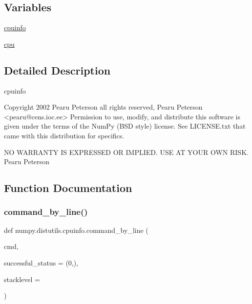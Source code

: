 \subsection*{Variables}
\begin{DoxyCompactItemize}
\item 
\hyperlink{namespacenumpy_1_1distutils_1_1cpuinfo_a7060d89d9372a4fc5fea1cf19eb6fce4}{cpuinfo}
\item 
\hyperlink{namespacenumpy_1_1distutils_1_1cpuinfo_a91351a94ec2341725d2f392f6b5bc469}{cpu}
\end{DoxyCompactItemize}


\subsection{Detailed Description}
\begin{DoxyVerb}cpuinfo

Copyright 2002 Pearu Peterson all rights reserved,
Pearu Peterson <pearu@cens.ioc.ee>
Permission to use, modify, and distribute this software is given under the
terms of the NumPy (BSD style) license.  See LICENSE.txt that came with
this distribution for specifics.

NO WARRANTY IS EXPRESSED OR IMPLIED.  USE AT YOUR OWN RISK.
Pearu Peterson\end{DoxyVerb}
 

\subsection{Function Documentation}
\mbox{\label{namespacenumpy_1_1distutils_1_1cpuinfo_aeb25608a6416293178e3a489a1bab11c}} 
\subsubsection{\texorpdfstring{command\+\_\+by\+\_\+line()}{command\_by\_line()}}
{\footnotesize\ttfamily def numpy.\+distutils.\+cpuinfo.\+command\+\_\+by\+\_\+line (\begin{DoxyParamCaption}\item[{}]{cmd,  }\item[{}]{successful\+\_\+status = {\ttfamily (0,)},  }\item[{}]{stacklevel = {} }\end{DoxyParamCaption})}

